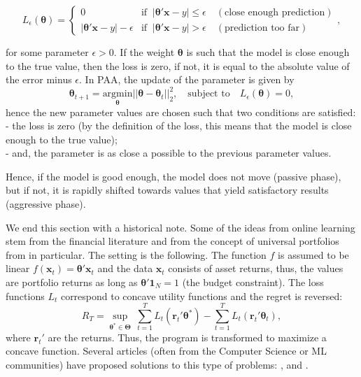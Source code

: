 \documentclass[]{krantz}
\theoremstyle{definition}
\theoremstyle{definition}
\theoremstyle{definition}
\theoremstyle{remark}
\begin{document}
\[L_\epsilon(\boldsymbol{\theta})=\left\{ \begin{array}{ll}
0 & \text{if } \ |\boldsymbol{\theta}'\textbf{x}-y|\le \epsilon \quad (\text{close enough prediction}) \\
|\boldsymbol{\theta}'\textbf{x}-y|- \epsilon & \text{if } \  |\boldsymbol{\theta}'\textbf{x}-y| >  \epsilon \quad (\text{prediction too far})
\end{array}\right.,\]

for some parameter \(\epsilon>0\). If the weight \(\boldsymbol{\theta}\)
is such that the model is close enough to the true value, then the loss
is zero, if not, it is equal to the absolute value of the error minus
\(\epsilon\). In PAA, the update of the parameter is given by
\[\boldsymbol{\theta}_{t+1}= \underset{\boldsymbol{\theta}}{\text{argmin}} ||\boldsymbol{\theta}-\boldsymbol{\theta}_t||_2^2, \quad \text{subject to} \quad L_\epsilon(\boldsymbol{\theta})=0,\]
hence the new parameter values are chosen such that two conditions are
satisfied:\\
- the loss is zero (by the definition of the loss, this means that the
model is close enough to the true value);\\
- and, the parameter is as close a possible to the previous parameter
values.

Hence, if the model is good enough, the model does not move (passive
phase), but if not, it is rapidly shifted towards values that yield
satisfactory results (aggressive phase).

We end this section with a historical note. Some of the ideas from
online learning stem from the financial literature and from the concept
of universal portfolios from \citet{cover1991universal} in particular.
The setting is the following. The function \(f\) is assumed to be linear
\(f(\textbf{x}_t)=\boldsymbol{\theta}'\textbf{x}_t\) and the data
\(\textbf{x}_t\) consists of asset returns, thus, the values are
portfolio returns as long as \(\boldsymbol{\theta}'\textbf{1}_N=1\) (the
budget constraint). The loss functions \(L_t\) correspond to concave
utility functions and the regret is reversed:
\[R_T=\underset{\boldsymbol{\theta}^*\in \boldsymbol{\Theta}}{\sup} \ \sum_{t=1}^TL_t(\textbf{r}_t'\boldsymbol{\theta}^*)-\sum_{t=1}^TL_t(\textbf{r}_t'\boldsymbol{\theta}_t),\]
where \(\textbf{r}_t'\) are the returns. Thus, the program is
transformed to maximize a concave function. Several articles (often from
the Computer Science or ML communities) have proposed solutions to this
type of problems: \citet{blum1999universal},
\citet{agarwal2006algorithms} and \citet{hazan2007logarithmic}.
\end{document}
